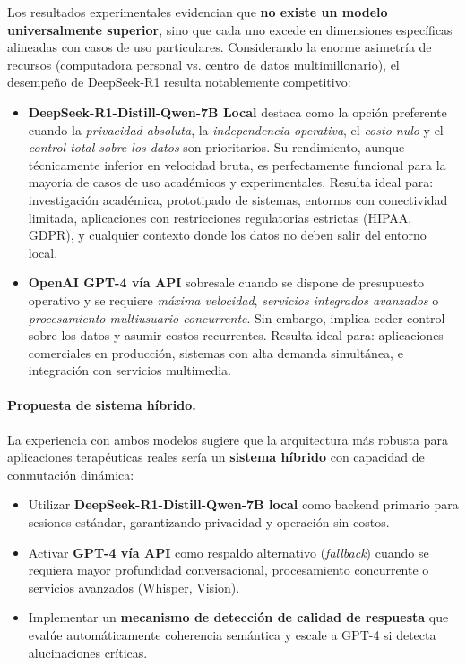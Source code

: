 \documentclass[12pt,a4paper]{report}
\numberwithin{figure}{section}
\begin{document}
Los resultados experimentales evidencian que \textbf{no existe un modelo universalmente superior}, sino que cada uno excede en dimensiones específicas alineadas con casos de uso particulares. Considerando la enorme asimetría de recursos (computadora personal vs. centro de datos multimillonario), el desempeño de DeepSeek-R1 resulta notablemente competitivo:

\begin{itemize}
    \item \textbf{DeepSeek-R1-Distill-Qwen-7B Local} destaca como la opción preferente cuando la \textit{privacidad absoluta}, la \textit{independencia operativa}, el \textit{costo nulo} y el \textit{control total sobre los datos} son prioritarios. Su rendimiento, aunque técnicamente inferior en velocidad bruta, es perfectamente funcional para la mayoría de casos de uso académicos y experimentales. Resulta ideal para: investigación académica, prototipado de sistemas, entornos con conectividad limitada, aplicaciones con restricciones regulatorias estrictas (HIPAA, GDPR), y cualquier contexto donde los datos no deben salir del entorno local.

    \item \textbf{OpenAI GPT-4 vía API} sobresale cuando se dispone de presupuesto operativo y se requiere \textit{máxima velocidad}, \textit{servicios integrados avanzados} o \textit{procesamiento multiusuario concurrente}. Sin embargo, implica ceder control sobre los datos y asumir costos recurrentes. Resulta ideal para: aplicaciones comerciales en producción, sistemas con alta demanda simultánea, e integración con servicios multimedia.
\end{itemize}

\paragraph{Propuesta de sistema híbrido.}

La experiencia con ambos modelos sugiere que la arquitectura más robusta para aplicaciones terapéuticas reales sería un \textbf{sistema híbrido} con capacidad de conmutación dinámica:
\begin{itemize}
    \item Utilizar \textbf{DeepSeek-R1-Distill-Qwen-7B local} como backend primario para sesiones estándar, garantizando privacidad y operación sin costos.
    \item Activar \textbf{GPT-4 vía API} como respaldo alternativo (\textit{fallback}) cuando se requiera mayor profundidad conversacional, procesamiento concurrente o servicios avanzados (Whisper, Vision).
    \item Implementar un \textbf{mecanismo de detección de calidad de respuesta} que evalúe automáticamente coherencia semántica y escale a GPT-4 si detecta alucinaciones críticas.
\end{itemize}
\end{document}
